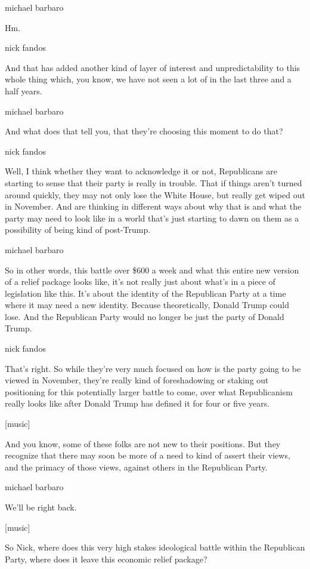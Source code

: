 michael barbaro

Hm.

nick fandos

And that has added another kind of layer of interest and
unpredictability to this whole thing which, you know, we have not seen a
lot of in the last three and a half years.

michael barbaro

And what does that tell you, that they're choosing this moment to do
that?

nick fandos

Well, I think whether they want to acknowledge it or not, Republicans
are starting to sense that their party is really in trouble. That if
things aren't turned around quickly, they may not only lose the White
House, but really get wiped out in November. And are thinking in
different ways about why that is and what the party may need to look
like in a world that's just starting to dawn on them as a possibility of
being kind of post-Trump.

michael barbaro

So in other words, this battle over \$600 a week and what this entire
new version of a relief package looks like, it's not really just about
what's in a piece of legislation like this. It's about the identity of
the Republican Party at a time where it may need a new identity. Because
theoretically, Donald Trump could lose. And the Republican Party would
no longer be just the party of Donald Trump.

nick fandos

That's right. So while they're very much focused on how is the party
going to be viewed in November, they're really kind of foreshadowing or
staking out positioning for this potentially larger battle to come, over
what Republicanism really looks like after Donald Trump has defined it
for four or five years.

{[}music{]}

And you know, some of these folks are not new to their positions. But
they recognize that there may soon be more of a need to kind of assert
their views, and the primacy of those views, against others in the
Republican Party.

michael barbaro

We'll be right back.

{[}music{]}

So Nick, where does this very high stakes ideological battle within the
Republican Party, where does it leave this economic relief package?

